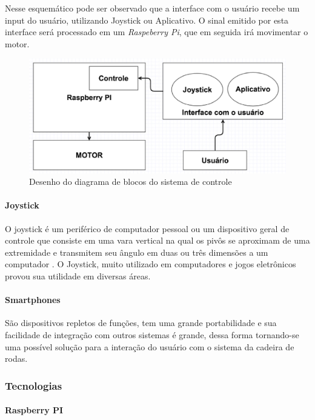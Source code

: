Nesse esquemático pode ser observado que a interface com o usuário recebe um input do usuário, utilizando Joystick ou Aplicativo. O sinal emitido por esta interface será processado em um \textit{Raspeberry Pi}, que em seguida irá movimentar o motor.

\begin{figure}[!htb]
\centering
  \includegraphics[keepaspectratio=true,scale=0.6]{figuras/controle/diagrama_blocos}
\caption{Desenho do diagrama de blocos do sistema de controle}
\label{fig:diagrama_blocos}
\end{figure}

\paragraph{Joystick}
O joystick é um periférico de computador pessoal ou um dispositivo geral de controle que consiste em uma vara vertical na qual os pivôs se aproximam de uma extremidade e transmitem seu ângulo em duas ou três dimensões a um computador \cite{livro_creating_games}. O Joystick, muito utilizado em computadores e jogos eletrônicos provou sua utilidade em diversas áreas.

\paragraph{Smartphones}
São dispositivos repletos de funções, tem uma grande portabilidade e sua facilidade de integração com outros sistemas é grande, dessa forma tornando-se uma possível solução para a interação do usuário com o sistema da cadeira de rodas.

 \subsubsection{Tecnologias}

\paragraph{Raspberry PI}

